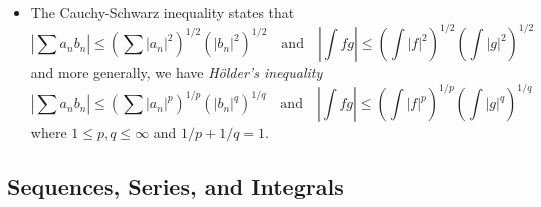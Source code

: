 \documentclass[answers]{exam}
\begin{document}
\begin{itemize}
	\item The Cauchy-Schwarz inequality states that
	\[ \left| \sum a_n b_n \right| \leq \left( \sum |a_n|^2 \right)^{1/2} \left( |b_n|^2 \right)^{1/2} \quad\text{and}\quad \left| \int f g \right| \leq \left( \int |f|^2 \right)^{1/2} \left( \int |g|^2 \right)^{1/2} \]
	and more generally, we have \emph{H\"{o}lder's inequality}
	\[ | \sum a_n b_n | \leq \left( \sum |a_n|^p \right)^{1/p} \left( |b_n|^q \right)^{1/q} \quad\text{and}\quad \left| \int f g \right| \leq \left( \int |f|^p \right)^{1/p} \left( \int |g|^q \right)^{1/q} \]
	where $1 \leq p,q \leq \infty$ and $1/p + 1/q = 1$.


\end{itemize}

\subsection*{Sequences, Series, and Integrals}
\end{document}
